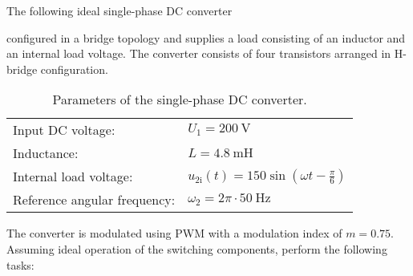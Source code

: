 

The following ideal single-phase DC converter
 

configured in a bridge topology and supplies a load consisting of an inductor and an internal load voltage. The converter consists
of four transistors arranged in H-bridge configuration.

\begin{table}[ht]
    \centering  %
    \begin{tabular}{ll}
        \toprule
        Input DC voltage: & $U_{\mathrm{1}}=\SI{200}{\volt}$ \\
        Inductance: & $L = \SI{4.8}{\milli \henry}$ \\
        Internal load voltage: & $u_{2\mathrm{i}}(t) = 150 \sin(\omega t - \frac{\pi}{6})$ \\ 
        Reference angular frequency: & $\omega_2 = 2\pi \cdot \SI{50}{\hertz}$ \\ 
        \bottomrule
    \end{tabular}
    \caption{Parameters of the single-phase DC converter.}  
    \label{table:ex07_Task1_ParametersOfTheCircuit}
\end{table}
The converter is modulated using PWM with a modulation index of $m=0.75$.  Assuming ideal operation of the switching components, perform the following tasks:


